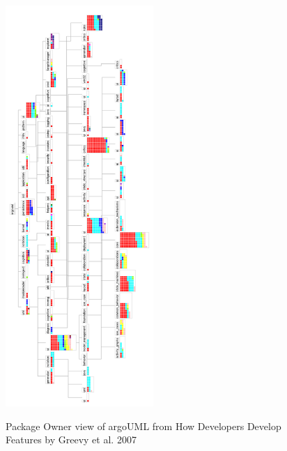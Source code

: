 \begin{figure}[H]
\centering
\includegraphics[width=0.5\textwidth]{./resources/annex_package_owner.png}~
\caption{Package Owner view of argoUML from How Developers Develop Features by Greevy et al. 2007}
\label{fig:ownership_map_by_feature}
\end{figure}

